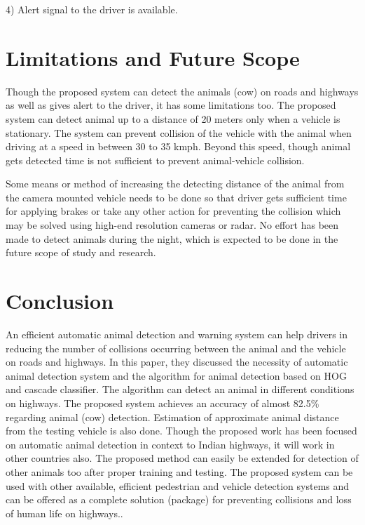 \documentclass[14pt,a4paper,final]{extreport}
\begin{document}
\item 4) Alert signal to the driver is available.

\chapter{Limitations and Future Scope}
\item Though the proposed system can detect the animals (cow) on roads and highways as well as gives alert to the driver, it has some limitations too. The proposed system can detect animal up to a distance of 20 meters only when a vehicle is stationary. The system can prevent collision of the vehicle with the animal when driving at a speed in between 30 to 35 kmph. Beyond this speed, though animal gets detected time is not sufficient to prevent animal-vehicle collision.

\item Some means or method of increasing the detecting distance of the animal from the camera mounted vehicle needs to be done so that driver gets sufficient time for applying brakes or take any other action for preventing the collision which may be solved using high-end resolution cameras or radar. No effort has been made to detect animals during the night, which is expected to be done in the future scope of study and research.

\chapter{Conclusion}
An efficient automatic animal detection and warning system can help drivers in reducing the number of collisions occurring between the animal and the vehicle on roads and highways. In this paper, they discussed the necessity of automatic animal detection system and the algorithm for animal detection based on HOG and cascade classifier. The algorithm can detect an animal in different conditions on highways. The proposed system achieves an accuracy of almost 82.5\% regarding animal (cow) detection. Estimation of approximate animal distance from the testing vehicle is also done. Though the proposed work has been focused on automatic animal detection in context to Indian highways, it will work in other countries also. The proposed method can easily be extended for detection of other animals too after proper training and testing. The proposed system can be used with other available, efficient pedestrian and vehicle detection systems and can be offered as a complete solution (package) for preventing collisions and loss of human life on highways..
\end{document}
